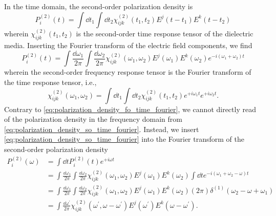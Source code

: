 In the time domain, the second-order polarization density is~\cite[p.~55]{Boyd2020}
\begin{equation}
	P_i^{(2)}(t)
	=
	\int\dd{t_1}
	\int\dd{t_2}
	\chi^{(2)}_{ijk}(t_1,t_2)
	E^j(t-t_1)
	E^k(t-t_2)
	\label{eq:polarization_density_so_time}
\end{equation}
wherein $\chi^{(2)}_{ijk}(t_1,t_2)$ is the second-order time response tensor of the dielectric media.
Inserting the Fourier transform of the electric field components, we find
\begin{equation}
	P_i^{(2)}(t)
	=
	\int\frac{\dd{\omega_1}}{2\pi}
	\int\frac{\dd{\omega_2}}{2\pi}
	\chi^{(2)}_{ijk}(\omega_1,\omega_2)
	E^j(\omega_1)
	E^k(\omega_2)
	e^{-i(\omega_1+\omega_2)t}
	\label{eq:polarization_density_so_time_fourier}
\end{equation}
wherein the second-order frequency response tensor is the Fourier transform of the time response tensor, i.e.,
\begin{equation}
	\chi^{(2)}_{ijk}(\omega_1,\omega_2)
	=
	\int\dd{t_1}
	\int\dd{t_2}
	\chi^{(2)}_{ijk}(t_1,t_2)
	e^{+i\omega_1t}
	e^{+i\omega_2t}
	.
\end{equation}
Contrary to \cref{eq:polarization_density_fo_time_fourier}, we cannot directly read of the polarization density in the frequency domain from \cref{eq:polarization_density_so_time_fourier}.
Instead, we insert \cref{eq:polarization_density_so_time_fourier} into the Fourier transform of the second-order polarization density
\begin{equation}
	\begin{split}
		P_i^{(2)}(\omega)
		&=
		\int\dd{t}
		P_i^{(2)}(t)
		e^{+i\omega t}
		\\
		&=
		\int\frac{\dd{\omega_1}}{2\pi}
		\int\frac{\dd{\omega_2}}{2\pi}
		\chi^{(2)}_{ijk}(\omega_1,\omega_2)
		E^j(\omega_1)
		E^k(\omega_2)
		\int\dd{t}
		e^{-i(\omega_1+\omega_2-\omega)t}
		\\
		&=
		\int\frac{\dd{\omega_1}}{2\pi}
		\int\frac{\dd{\omega_2}}{2\pi}
		\chi^{(2)}_{ijk}(\omega_1,\omega_2)
		E^j(\omega_1)
		E^k(\omega_2)
		(2\pi)
		\delta^{(1)}(\omega_2-\omega+\omega_1)
		\\
		&=
		\int\frac{\dd{\omega^\prime}}{2\pi}
		\chi^{(2)}_{ijk}(\omega^\prime,\omega-\omega^\prime)
		E^j(\omega^\prime)
		E^k(\omega-\omega^\prime)
		.
	\end{split}
	\label{eq:polarization_density_so_freq}
\end{equation}

